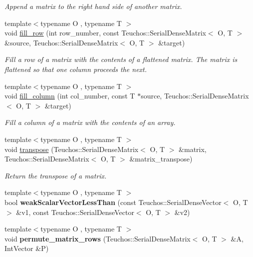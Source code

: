 \begin{DoxyCompactItemize}
\begin{DoxyCompactList}\small\item\em Append a matrix to the right hand side of another matrix. \end{DoxyCompactList}\item 
{\footnotesize template$<$typename O , typename T $>$ }\\void \hyperlink{LinearAlgebra_8hpp_aadaded2a73f9fb2b067852789b27998d}{fill\+\_\+row} (int row\+\_\+number, const Teuchos\+::\+Serial\+Dense\+Matrix$<$ O, T $>$ \&source, Teuchos\+::\+Serial\+Dense\+Matrix$<$ O, T $>$ \&target)\label{LinearAlgebra_8hpp_aadaded2a73f9fb2b067852789b27998d}

\begin{DoxyCompactList}\small\item\em Fill a row of a matrix with the contents of a flattened matrix. The matrix is flattened so that one column proceeds the next. \end{DoxyCompactList}\item 
{\footnotesize template$<$typename O , typename T $>$ }\\void \hyperlink{LinearAlgebra_8hpp_aded8812f89e460bf019790d70115f768}{fill\+\_\+column} (int col\+\_\+number, const T $\ast$source, Teuchos\+::\+Serial\+Dense\+Matrix$<$ O, T $>$ \&target)
\begin{DoxyCompactList}\small\item\em Fill a column of a matrix with the contents of an array. \end{DoxyCompactList}\item 
{\footnotesize template$<$typename O , typename T $>$ }\\void \hyperlink{LinearAlgebra_8hpp_ac7b848e98c74fb4bc884c273c4251e02}{transpose} (Teuchos\+::\+Serial\+Dense\+Matrix$<$ O, T $>$ \&matrix, Teuchos\+::\+Serial\+Dense\+Matrix$<$ O, T $>$ \&matrix\+\_\+transpose)
\begin{DoxyCompactList}\small\item\em Return the transpose of a matrix. \end{DoxyCompactList}\item 
{\footnotesize template$<$typename O , typename T $>$ }\\bool {\bfseries weak\+Scalar\+Vector\+Less\+Than} (const Teuchos\+::\+Serial\+Dense\+Vector$<$ O, T $>$ \&v1, const Teuchos\+::\+Serial\+Dense\+Vector$<$ O, T $>$ \&v2)\label{LinearAlgebra_8hpp_a7b8da1d2ca88d940c4014cd7e11c9c13}

\item 
{\footnotesize template$<$typename O , typename T $>$ }\\void {\bfseries permute\+\_\+matrix\+\_\+rows} (Teuchos\+::\+Serial\+Dense\+Matrix$<$ O, T $>$ \&A, Int\+Vector \&P)\label{LinearAlgebra_8hpp_ac6c3079eb126c29ca623260dc2bf0a1b}


\end{DoxyCompactItemize}
